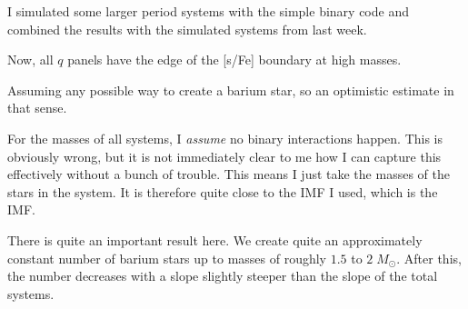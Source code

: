 \documentclass[a4paper,10pt]{article}
\begin{document}
\begin{figure}[ht]
	\centering
\end{figure}


I simulated some larger period systems with the simple binary code and combined the results
with the simulated systems from last week.

\begin{figure}[ht]
	\centering
\end{figure}

Now, all \(q\) panels have the edge of the [s/Fe] boundary at high masses.

\begin{figure}[ht]
	\centering
\end{figure}

Assuming any possible way to create a barium star, so an optimistic estimate in that sense.

\begin{figure}[ht]
	\centering
\end{figure}

\begin{figure}[ht]
	\centering
\end{figure}

For the masses of all systems, I \emph{assume} no binary interactions happen.
This is obviously wrong, but it is not immediately clear to me how I can capture this effectively without
a bunch of trouble.
This means I just take the masses of the stars in the system.
It is therefore quite close to the IMF I used, which is the \citet{kroupa1902} IMF.

There is quite an important result here.
We create quite an approximately constant number of barium stars up to masses of roughly \(1.5\) to \(2\; M_\odot \).
After this, the number decreases with a
slope slightly steeper than the slope of the total systems.
\end{document}
